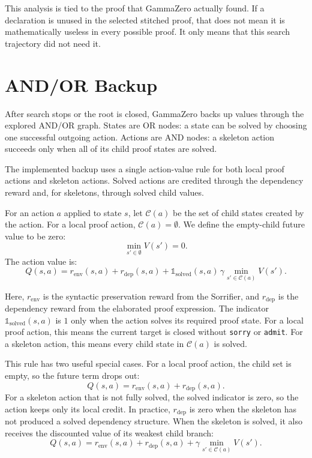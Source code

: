 \documentclass[en]{uet_awesome_thesis/uet-awesome-thesis}
\begin{document}
This analysis is tied to the proof that GammaZero actually found. If a declaration is unused in the
selected stitched proof, that does not mean it is mathematically useless in every possible proof. It only
means that this search trajectory did not need it.

\section{AND/OR Backup}
\label{subsec:and-or-backup}

After search stops or the root is closed, GammaZero backs up values through the explored AND/OR graph.
States are OR nodes: a state can be solved by choosing one successful outgoing action. Actions are AND
nodes: a skeleton action succeeds only when all of its child proof states are solved.

The implemented backup uses a single action-value rule for both local proof actions and skeleton
actions. Solved actions are credited through the dependency reward and, for skeletons, through solved
child values.

For an action \(a\) applied to state \(s\), let \(\mathcal{C}(a)\) be the set of child states created by the
action. For a local proof action, \(\mathcal{C}(a)=\emptyset\). We define the empty-child future value to
be zero:
\[
\min_{s' \in \emptyset} V(s') = 0.
\]
The action value is:
\[
Q(s,a) =
r_{\mathrm{env}}(s,a)
+
r_{\mathrm{dep}}(s,a)
+
\mathds{1}_{\mathrm{solved}}(s,a)\,
\gamma
\min_{s' \in \mathcal{C}(a)} V(s').
\]

Here, \(r_{\mathrm{env}}\) is the syntactic preservation reward from the Sorrifier, and
\(r_{\mathrm{dep}}\) is the dependency reward from the elaborated proof expression. The indicator
\(\mathds{1}_{\mathrm{solved}}(s,a)\) is \(1\) only when the action solves its required proof state. For a
local proof action, this means the current target is closed without \texttt{sorry} or \texttt{admit}. For a
skeleton action, this means every child state in \(\mathcal{C}(a)\) is solved.

This rule has two useful special cases. For a local proof action, the child set is empty, so the future term
drops out:
\[
Q(s,a)=r_{\mathrm{env}}(s,a)+r_{\mathrm{dep}}(s,a).
\]
For a skeleton action that is not fully solved, the solved indicator is zero, so the action keeps only its
local credit. In practice, \(r_{\mathrm{dep}}\) is zero when the skeleton has not produced a solved
dependency structure. When the skeleton is solved, it also receives the discounted value of its weakest
child branch:
\[
Q(s,a)=
r_{\mathrm{env}}(s,a)
+
r_{\mathrm{dep}}(s,a)
+
\gamma \min_{s' \in \mathcal{C}(a)} V(s').
\]
\end{document}
